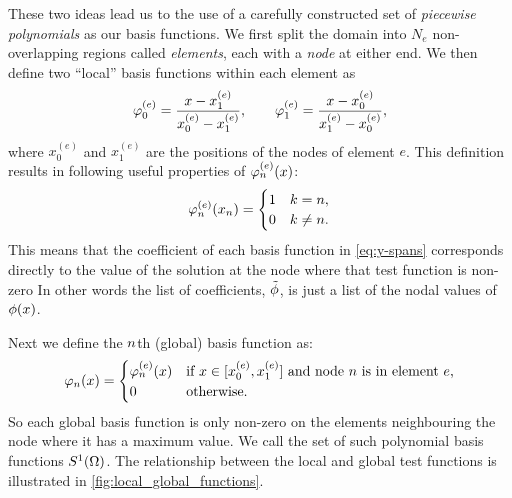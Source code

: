 These two ideas lead us to the use of a carefully constructed set of \emph{piecewise polynomials} as our basis functions.
We first split the domain into $N_e$ non-overlapping regions called \emph{elements}, each with a \emph{node} at either end.
We then define two ``local'' basis functions within each element as
\begin{equation}
  \varphi^{(e)}_{0}=\dfrac{x-x^{(e)}_{1}}{x^{(e)}_{0}-x^{(e)}_{1}},\qquad
  \varphi^{(e)}_{1}=\dfrac{x-x^{(e)}_{0}}{x^{(e)}_{1}-x^{(e)}_{0}},
  \label{eq:simple_lagrange}
\end{equation}
where $x^{(e)}_0$ and $x^{(e)}_1$ are the positions of the nodes of element $e$.
This definition results in following useful properties of $\varphi^{(e)}_{n}(x)$:
\begin{equation}
  \label{eq:35}
  \varphi^{(e)}_{n}(x_{n}) =
  \begin{cases}
    1 & k = n, \\
    0 & k \neq n.
  \end{cases}
\end{equation}
This means that the coefficient of each basis function in \cref{eq:y-spans} corresponds directly to the value of the solution at the node where that test function is non-zero
In other words the list of coefficients, $\tilde{\phi}$, is just a list of the nodal values of $\phi(x)$.

Next we define the $n$th (global) basis function as:
\begin{equation}
  \label{eq:33}
  \varphi_n(x) =
  \begin{cases}
    \varphi_n^{(e)}(x) & \text{if $x \in [x^{(e)}_0, x^{(e)}_1]$ and node $n$ is in element $e$,} \\
    0 & \text{otherwise.}
  \end{cases}
\end{equation}
So each global basis function is only non-zero on the elements neighbouring the node where it has a maximum value.
We call the set of such polynomial basis functions ${S^1_{{}}(\Omega)}$.
The relationship between the local and global test functions is illustrated in \cref{fig:local_global_functions}.

